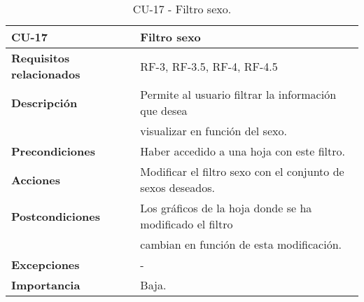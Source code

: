 \begin{table}[ht!]
    \centering
    \resizebox{15cm}{!} {
    \begin{tabular}{|l|l|}
    \hline
         \textbf{CU-17}     &  \textbf{Filtro sexo} \\ \hline
         \textbf{Requisitos relacionados}       & RF-3, RF-3.5, RF-4, RF-4.5 \\ \hline
         \textbf{Descripción}    & Permite al usuario filtrar la información que desea \\&visualizar en función del sexo. \\ \hline   
         \textbf{Precondiciones}      & Haber accedido a una hoja con este filtro.\\ \hline
         \textbf{Acciones}      &Modificar el filtro sexo con el conjunto de sexos deseados.   \\ \hline
         \textbf{Postcondiciones}       & Los gráficos de la hoja donde se ha modificado el filtro \\&cambian en función de esta modificación. \\ \hline
         \textbf{Excepciones}       & -  \\ \hline
         \textbf{Importancia}   &Baja. \\
         \hline
    \end{tabular}}
    \caption{CU-17 - Filtro sexo.}
    \label{tab:my_label}
\end{table}


